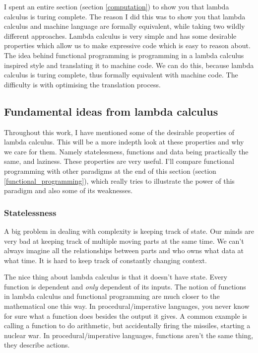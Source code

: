 \documentclass[11pt]{article}
\begin{document}
I spent an entire section (section \ref{computation}) to show you that lambda
calculus is turing complete. The reason I did this was to show you that lambda
calculus and machine language are formally equivalent, while taking two wildly
different approaches. Lambda calculus is very simple and has some desirable
properties which allow us to make expressive code which is easy to reason
about. The idea behind functional programming is programming in a lambda
calculus inspired style and translating it to machine code. We can do this,
because lambda calculus is turing complete, thus formally equivalent with
machine code. The difficulty is with optimising the translation process.

\subsection{Fundamental ideas from lambda calculus}

Throughout this work, I have mentioned some of the desirable properties of
lambda calculus. This will be a more indepth look at these properties and why
we care for them. Namely statelessness, functions and data being practically
the same, and laziness. These properties are very useful. I'll compare
functional programming with other paradigms at the end of this section (section
\ref{functional_programming}), which really tries to illustrate the power of
this paradigm and also some of its weaknesses.

\subsubsection{Statelessness}\label{statelessness}

A big problem in dealing with complexity is keeping track of state. Our minds
are very bad at keeping track of multiple moving parts at the same time. We
can't always imagine all the relationships between parts and who owns what data
at what time. It is hard to keep track of constantly changing context.

The nice thing about lambda calculus is that it doesn't have state. Every
function is dependent and \emph{only} dependent of its inputs. The notion of
functions in lambda calculus and functional programming are much closer to the
mathematical one this way. In procedural/imperative languages, you never know
for sure what a function does besides the output it gives. A common example is
calling a function to do arithmetic, but accidentally firing the missiles,
starting a nuclear war. In procedural/imperative languages, functions aren't
the same thing, they describe actions.
\end{document}
